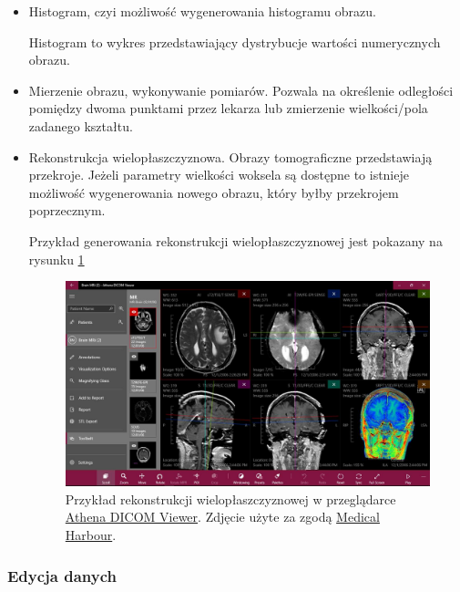 \begin{itemize}
    \item Histogram, czyi możliwość wygenerowania histogramu obrazu.

          Histogram to wykres przedstawiający dystrybucje wartości numerycznych obrazu.

    \item Mierzenie obrazu, wykonywanie pomiarów.
          Pozwala na określenie odległości pomiędzy dwoma punktami przez lekarza lub zmierzenie wielkości/pola zadanego kształtu.

    \item Rekonstrukcja wielopłaszczyznowa.
          Obrazy tomograficzne przedstawiają przekroje.
          Jeżeli parametry wielkości woksela są dostępne to istnieje możliwość wygenerowania nowego obrazu, który byłby przekrojem poprzecznym.

          Przykład generowania rekonstrukcji wielopłaszczyznowej jest pokazany na rysunku \ref{fig:dicomviewer003}

          \begin{figure}[!htbp]
              \centering
              \includegraphics[width=\textwidth]{img/dicom-viewer-003.jpeg}
              \caption{Przykład rekonstrukcji wielopłaszczyznowej w przeglądarce \href{https://athenadicomviewer.com/}{Athena DICOM Viewer}. Zdjęcie użyte za zgodą \href{https://medicalharbour.com/}{Medical Harbour}.}
              \label{fig:dicomviewer003}
          \end{figure}
\end{itemize}

\subsubsection{Edycja danych}


